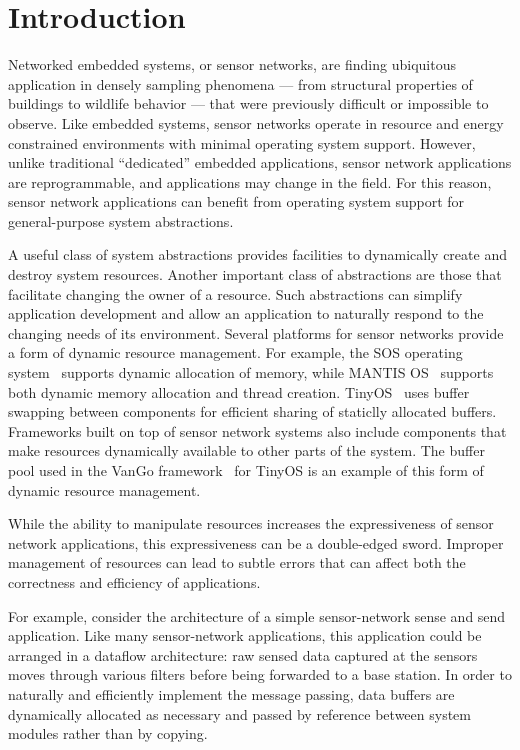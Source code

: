 \section{Introduction}
\label{sec:intro}

Networked embedded systems, or sensor networks, are finding ubiquitous
application in densely sampling phenomena --- from structural
properties of buildings to wildlife behavior --- that were previously
difficult or impossible to observe.  Like embedded systems, sensor
networks operate in resource and energy constrained environments with
minimal operating system support.  However, unlike traditional
``dedicated'' embedded applications, sensor network applications are
reprogrammable, and applications may change in the field.  For this
reason, sensor network applications can benefit from operating system
support for general-purpose system abstractions.

A useful class of system abstractions provides facilities to
dynamically create and destroy system resources.  
%
Another important class of abstractions are those that facilitate
changing the owner of a resource.
%
Such abstractions can simplify application development and allow an
application to naturally respond to the changing needs of its
environment.  Several platforms for sensor networks provide a form of
dynamic resource management.  For example, the SOS operating
system~\cite{sos} supports dynamic allocation of memory, while MANTIS
OS~\cite{abrach03mantis} supports both dynamic memory allocation and
thread creation.  TinyOS~\cite{TinyOS} uses buffer swapping between
components for efficient sharing of staticlly allocated buffers.
Frameworks built on top of sensor network systems also include
components that make resources dynamically available to other parts of
the system.  The buffer pool used in the VanGo
framework~\cite{greenstein05vango} for TinyOS is an example of this
form of dynamic resource management.

While the ability to manipulate resources increases the expressiveness
of sensor network applications, this expressiveness can be a
double-edged sword.  Improper management of resources can lead to
subtle errors that can affect both the correctness and efficiency of
applications.

For example, consider the architecture of a simple sensor-network
sense and send application.
Like many sensor-network applications, this application could be
arranged in a dataflow architecture:  raw sensed data captured at the
sensors moves through various filters
before being forwarded to a base station.
In order to naturally and efficiently implement the message passing,
data buffers are dynamically allocated as necessary and passed by
reference between system modules rather than by copying.

